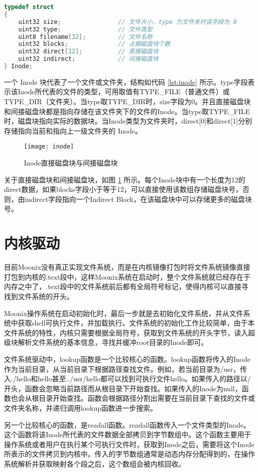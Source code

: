 \begin{lstlisting}[language={C}, caption={SimpleFS Inode结构}, label={lst:inode}]
typedef struct
{
	uint32 size;                // 文件大小，type 为文件夹时该字段为 0
	uint32 type;                // 文件类型
	uint8 filename[32];         // 文件名称
	uint32 blocks;              // 占据磁盘块个数
	uint32 direct[12];          // 直接磁盘块
	uint32 indirect;            // 间接磁盘块
} Inode;
\end{lstlisting}

一个 Inode 块代表了一个文件或文件夹，结构如代码 \ref{lst:inode} 所示。type字段表示该Inode所代表的文件的类型，可用取值有TYPE\_FILE（普通文件）或TYPE\_DIR（文件夹）。当type取TYPE\_DIR时，size字段为0。并且直接磁盘块和间接磁盘块都是指向存储在该文件夹下的文件的Inode。当type取TYPE\_FILE时，磁盘块指向实际的数据块。当Inode类型为文件夹时，direct[0]和direct[1]分别存储指向当前和指向上一级文件夹的 Inode。

\begin{figure}[htpb]
	\centering
	\texttt{[image: inode]}
	\setlength{\abovecaptionskip}{2pt}
	\caption{Inode直接磁盘块与间接磁盘块}
	\label{pic:inode}
\end{figure}

关于直接磁盘块和间接磁盘块，如图 \ref{pic:inode} 所示。每个Inode块中有一个长度为12的direct数据，如果blocks字段小于等于12，可以直接使用该数组存储磁盘块号，否则，由indirect字段指向一个Indirect Block，在该磁盘块中可以存储更多的磁盘块号。

\section{内核驱动}

目前Moonix没有真正实现文件系统，而是在内核镜像打包时将文件系统镜像直接打包到内核的.text段中，这样Moonix系统在启动时，整个文件系统就已经存在于内存之中了，.text段中的文件系统前后都有全局符号标记，使得内核可以直接寻找到文件系统的开头。

Moonix操作系统在启动初始化时，最后一步就是去初始化文件系统，并从文件系统中获取shell可执行文件，并加载执行。文件系统的初始化工作比较简单，由于本文件系统的特性，内核只需要根据全局符号，获取到文件系统的开头字节，读入超级块解析文件系统的基本信息，寻找并缓冲root目录的Inode即可。

文件系统驱动中，lookup函数是一个比较核心的函数。lookup函数将传入的Inode作为当前目录，从当前目录下根据路径查找文件。例如，若当前目录为/usr，传入./hello和hello甚至../usr/hello都可以找到可执行文件hello。如果传入的路径以/开头，函数会忽略当前路径而从根目录下开始查找。如果传入的Inode为null，函数也会从根目录开始查找。函数会根据路径分割出需要在当前目录下查找的文件或文件夹名称，并递归调用lookup函数进一步搜索。

另一个比较核心的函数，是readall函数。readall函数传入一个文件类型的Inode。这个函数将该Inode所代表的文件数据全部拷贝到字节数组中。这个函数主要用于操作系统或者用户在执行某个可执行文件时，获取到Inode之后，需要将这个Inode所表示的文件拷贝到内核中。传入的字节数组通常是动态内存分配得到的，在操作系统解析并获取映射各个段之后，这个数组会被内核回收。